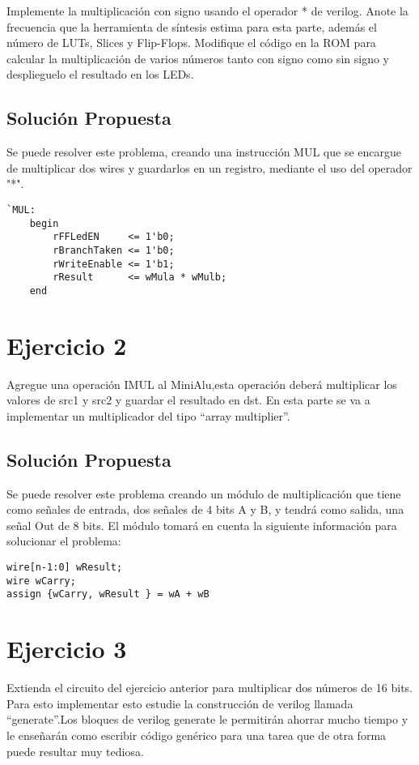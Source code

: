 \documentclass[10pt]{article}
\begin{document}
Implemente la multiplicación con signo usando el operador * de verilog. Anote la frecuencia que la herramienta de síntesis estima para esta parte, además el número de LUTs, Slices y Flip-Flops. Modifique el código en la ROM para calcular la multiplicación de varios números tanto con signo como sin signo y desplieguelo el resultado en los LEDs.

\subsection*{Solución Propuesta}
Se puede resolver este problema, creando una instrucción MUL que se encargue de multiplicar dos wires y guardarlos en un registro, mediante
el uso del operador "*".

\begin{lstlisting}
`MUL:
	begin
		rFFLedEN     <= 1'b0;
		rBranchTaken <= 1'b0;
		rWriteEnable <= 1'b1;
		rResult      <= wMula * wMulb;
	end
\end{lstlisting}

\newpage
\section*{Ejercicio 2}
Agregue una operación IMUL al MiniAlu,esta operación deberá multiplicar los valores de
src1 y src2 y guardar el resultado en dst.
En esta parte se va a  implementar un multiplicador del tipo “array multiplier”.

\subsection*{Solución Propuesta}
Se puede resolver este problema creando un módulo de multiplicación que tiene como señales de entrada, dos señales de 4 bits A y B, y tendrá 
como salida, una señal Out de 8 bits.
El módulo tomará en cuenta la siguiente información para solucionar el problema:

\begin{lstlisting}
wire[n-1:0] wResult;
wire wCarry;     
assign {wCarry, wResult } = wA + wB
\end{lstlisting}

\newpage
\section*{Ejercicio 3}
Extienda el circuito del ejercicio anterior para multiplicar dos números de 16 bits. 
Para esto implementar esto estudie la construcción de verilog llamada “generate”.Los bloques de verilog generate le permitirán ahorrar mucho tiempo y le 
enseñarán como escribir código genérico para una tarea que de otra forma puede resultar muy tediosa.
\end{document}

